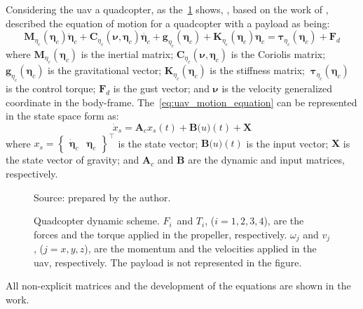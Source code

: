 Considering the \gls*{uav} a quadcopter, as the~\cref{fig:quadcopter_forces_scheme} shows, \citet{geronel2023}, based on the work of \citet{fossen1994}, described the equation of motion for a quadcopter with a payload as being:
%
\begin{equation}
    \mathbf{M}_{\eta_{c}}(\mathbf{\eta}_c)\ddot{\mathbf{\eta}}_c +
    \mathbf{C}_{\eta_c}(\mathbf{\nu},\mathbf{\eta}_c)\dot{\mathbf{\eta}_c} +
    \mathbf{g}_{\eta_c}(\mathbf{\eta}_c) +
    \mathbf{K}_{\eta_c}(\mathbf{\eta}_c)\mathbf{\eta}_c =
    \mathbf{\tau}_{\eta_c}(\mathbf{\eta}_c) + 
    \mathbf{F}_d
    \label{eq:uav_motion_equation}
\end{equation}
%
where \(\mathbf{M}_{\eta_{c}}(\mathbf{\eta}_c)\) is the inertial matrix; \(\mathbf{C}_{\eta_c}(\mathbf{\nu},\mathbf{\eta}_c)\) is the Coriolis matrix; \(\mathbf{g}_{\eta_c}(\mathbf{\eta}_c)\) is the gravitational vector; \(\mathbf{K}_{\eta_c}(\mathbf{\eta}_c)\) is the stiffness matrix; \(\ \mathbf{\tau}_{\eta_c}(\mathbf{\eta}_c)\) is the control torque; \(\mathbf{F}_d\) is the gust vector; and \(\mathbf{\nu}\) is the velocity generalized coordinate in the body-frame. 
The~\cref{eq:uav_motion_equation} can be represented in the state space form as:
%
\begin{equation}
    \dot{x}_s = \mathbf{A}_cx_s(t) + \mathbf{B}\mathbf(u)(t) + \mathbf{X}
\end{equation}
%
where \(x_s = \begin{Bmatrix} \dot{\mathbf{\eta}}_c & \mathbf{\eta}_c \end{Bmatrix}^{\top}\) is the state vector; \(\mathbf{B}\mathbf(u)(t)\) is the input vector; \(\mathbf{X}\) is the state vector of gravity; and \(\mathbf{A}_c\) and \(\mathbf{B}\) are the dynamic and input matrices, respectively.
%
\begin{figure}[!htb]
    \centering
    \caption[Quadcopter dynamic scheme]{Quadcopter dynamic scheme. \(F_i\,\) and \(T_i\), (\(i=1,2,3,4\)), are the forces and the torque applied in the propeller, respectively. \(\omega_j\) and \(v_j\), (\(j=x,y,z\)), are the momentum and the velocities applied in the \gls*{uav}, respectively. The payload is not represented in the figure.}
    
    
    {\footnotesize Source: prepared by the author.}
    \label{fig:quadcopter_forces_scheme}
\end{figure}

All non-explicit matrices and the development of the equations are shown in the \citet{geronel2023} work.

